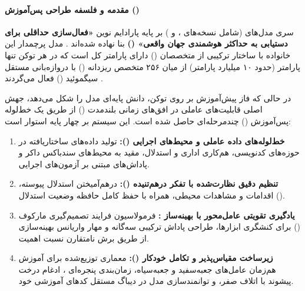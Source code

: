 \item {}

\paragraph*{مقدمه و فلسفه طراحی پس‌آموزش ()}
سری مدل‌های  (شامل نسخه‌های  ، و ) بر پایه پارادایم نوین \textbf{«فعال‌سازی حداقلی برای دستیابی به حداکثر هوشمندی جهان واقعی» ()} بنا نهاده شده‌اند \cite{minimax2026m2}. مدل پرچمدار این خانواده با ساختار ترکیبی از متخصصان () دارای  پارامتر کل است که در هر توکن تنها  پارامتر (حدود ۱۰ میلیارد پارامتر) از میان ۲۵۶ متخصص ریزدانه () با دروازه‌بانی مستقل سیگموئید () فعال می‌گردند \cite{dai2024deepseekmoe, shazeer2017outrageously, wang2024auxiliary}.

در حالی که فاز پیش‌آموزش بر روی  توکن، دانش پایه‌ای مدل را شکل می‌دهد، جهش اصلی قابلیت‌های عاملی در افق‌های زمانی بلندمدت () از طریق یک خط‌لوله پس‌آموزش () چندمرحله‌ای حاصل شده است. این سیستم بر چهار پایه استوار است:
\begin{enumerate}
    \item \textbf{خط‌لوله‌های داده عاملی و محیط‌های اجرایی ():} تولید داده‌های ساختاریافته در حوزه‌های کدنویسی، هم‌کاری اداری و استدلال، مقید به محیط‌های سندباکس داکر و پاداش‌های مبتنی بر آزمون‌های اجرایی.
    \item \textbf{تنظیم دقیق نظارت‌شده با تفکر درهم‌تنیده ():} درهم‌آمیختن استدلال پیوسته، اقدامات و مشاهدات محیطی، همراه با حفظ کامل حافظه وضعیت استدلال ().
    \item \textbf{یادگیری تقویتی عامل‌محور با بهینه‌ساز :} فرمولاسیون فرایند تصمیم‌گیری مارکوف () برای کنشگری ابزارها، طراحی پاداش ترکیبی سه‌گانه و مهار واریانس بهینه‌سازی از طریق برش نامتقارن نسبت اهمیت.
    \item \textbf{زیرساخت مقیاس‌پذیر  و تکامل خودکار ():} معماری توزیع‌شده برای آموزش هم‌زمان عامل‌های جعبه‌سفید و جعبه‌سیاه، زمان‌بندی پنجره‌ای ، ادغام درخت پیشوند با اتلاف صفر، و توانمندسازی مدل در دیباگ مستقل کدهای آموزشی خود.
\end{enumerate}

